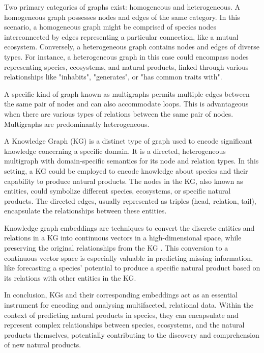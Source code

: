 \documentclass[
11pt, %
english, %
singlespacing, %
headsepline, %
chapterinoneline, %
]{MastersDoctoralThesis} %
\begin{document}
Two primary categories of graphs exist: homogeneous and heterogeneous. A homogeneous graph possesses nodes and edges of the same category. In this scenario, a homogeneous graph might be comprised of species nodes interconnected by edges representing a particular connection, like a mutual ecosystem. Conversely, a heterogeneous graph contains nodes and edges of diverse types. For instance, a heterogeneous graph in this case could encompass nodes representing species, ecosystems, and natural products, linked through various relationships like "inhabits", "generates", or "has common traits with".

A specific kind of graph known as multigraphs permits multiple edges between the same pair of nodes and can also accommodate loops. This is advantageous when there are various types of relations between the same pair of nodes. Multigraphs are predominantly heterogeneous.

A Knowledge Graph (KG) is a distinct type of graph used to encode significant knowledge concerning a specific domain. It is a directed, heterogeneous multigraph with domain-specific semantics for its node and relation types. In this setting, a KG could be employed to encode knowledge about species and their capability to produce natural products. The nodes in the KG, also known as entities, could symbolize different species, ecosystems, or specific natural products. The directed edges, usually represented as triples (head, relation, tail), encapsulate the relationships between these entities.

Knowledge graph embeddings are techniques to convert the discrete entities and relations in a KG into continuous vectors in a high-dimensional space, while preserving the original relationships from the KG \cite{wangKnowledgeGraphEmbedding2017}. This conversion to a continuous vector space is especially valuable in predicting missing information, like forecasting a species' potential to produce a specific natural product based on its relations with other entities in the KG.

In conclusion, KGs and their corresponding embeddings act as an essential instrument for encoding and analysing multifaceted, relational data. Within the context of predicting natural products in species, they can encapsulate and represent complex relationships between species, ecosystems, and the natural products themselves, potentially contributing to the discovery and comprehension of new natural products.

\end{document}
